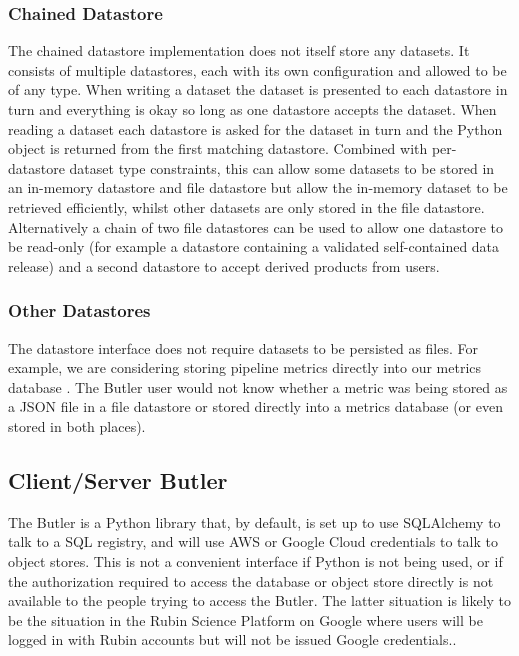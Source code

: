\documentclass[]{spie}
\begin{document}
\subsubsection{Chained Datastore}

The chained datastore implementation does not itself store any datasets.
It consists of multiple datastores, each with its own configuration and allowed to be of any type.
When writing a dataset the dataset is presented to each datastore in turn and everything is okay so long as one datastore accepts the dataset.
When reading a dataset each datastore is asked for the dataset in turn and the Python object is returned from the first matching datastore.
Combined with per-datastore dataset type constraints, this can allow some datasets to be stored in an in-memory datastore and file datastore but allow the in-memory dataset to be retrieved efficiently, whilst other datasets are only stored in the file datastore.
Alternatively a chain of two file datastores can be used to allow one datastore to be read-only (for example a datastore containing a validated self-contained data release) and a second datastore to accept derived products from users.

\subsubsection{Other Datastores}

The datastore interface does not require datasets to be persisted as files.
For example, we are considering storing pipeline metrics directly into our metrics database \cite{SQR-019,DMTN-203}.
The Butler user would not know whether a metric was being stored as a JSON file in a file datastore or stored directly into a metrics database (or even stored in both places).

\subsection{Client/Server Butler}

The Butler is a Python library that, by default, is set up to use SQLAlchemy to talk to a SQL registry, and will use AWS or Google Cloud credentials to talk to object stores.
This is not a convenient interface if Python is not being used, or if the authorization required to access the database or object store directly is not available to the people trying to access the Butler.
The latter situation is likely to be the situation in the Rubin Science Platform on Google where users will be logged in with Rubin accounts but will not be issued Google credentials.\cite{DMTN-182,2021arXiv211115030O}.
\end{document}
